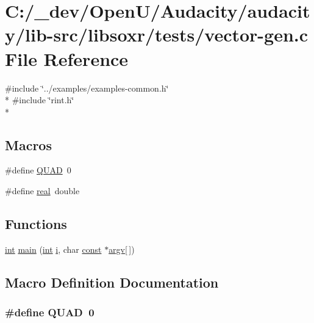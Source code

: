\hypertarget{vector-gen_8c}{}\section{C\+:/\+\_\+dev/\+Open\+U/\+Audacity/audacity/lib-\/src/libsoxr/tests/vector-\/gen.c File Reference}
\label{vector-gen_8c}
{\ttfamily \#include \char`\"{}../examples/examples-\/common.\+h\char`\"{}}\\*
{\ttfamily \#include \char`\"{}rint.\+h\char`\"{}}\\*
\subsection*{Macros}
\begin{DoxyCompactItemize}
\item 
\#define \hyperlink{vector-gen_8c_ac7252422b84a98d876dbc47ed5c0b5af}{Q\+U\+AD}~0
\item 
\#define \hyperlink{vector-gen_8c_a5f5a64ef503db0fc824df8320929b126}{real}~double
\end{DoxyCompactItemize}
\subsection*{Functions}
\begin{DoxyCompactItemize}
\item 
\hyperlink{xmltok_8h_a5a0d4a5641ce434f1d23533f2b2e6653}{int} \hyperlink{vector-gen_8c_a611271fd64dd2b026a95f9cf48586cd5}{main} (\hyperlink{xmltok_8h_a5a0d4a5641ce434f1d23533f2b2e6653}{int} \hyperlink{checksum_8c_ab80e330a3bc9e38c1297fe17381e92b4}{i}, char \hyperlink{getopt1_8c_a2c212835823e3c54a8ab6d95c652660e}{const} $\ast$\hyperlink{cmdline_8c_ad407d5ba91709bd9b092003858600723}{argv}\mbox{[}$\,$\mbox{]})
\end{DoxyCompactItemize}


\subsection{Macro Definition Documentation}
\subsubsection[{\texorpdfstring{Q\+U\+AD}{QUAD}}]{\setlength{\rightskip}{0pt plus 5cm}\#define Q\+U\+AD~0}\hypertarget{vector-gen_8c_ac7252422b84a98d876dbc47ed5c0b5af}{}\label{vector-gen_8c_ac7252422b84a98d876dbc47ed5c0b5af}


